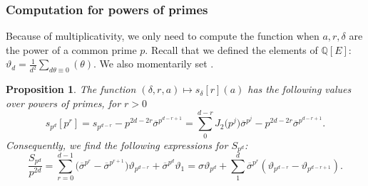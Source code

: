 \documentclass[pdftex]{sigma}
\newcommand{\QQ}{\mathbb{Q}}
\numberwithin{equation}{section}
\newtheorem{prop}[theo]{Proposition}
\theoremstyle{definition}
\begin{document}
\subsubsection{Computation for powers of primes} Because of multiplicativity, we only need to compute the function when $a,r,\delta$ are the power of a common prime $p$. Recall that we defined the elements of $\QQ[E]$: $\vartheta_d=\frac{1}{d^2}\sum_{d\theta\equiv 0}(\theta)$. We also momentarily set .


\begin{prop}\label{prop-expression-powers-primes}
 The function $(\delta,r,a)\mapsto s_\delta[r](a)$ has the following values over powers of primes, for $r>0$
 \[ s_{p^d}[p^r]=s_{p^{d-r}}-p^{2d-2r}\overline{\sigma}^{p^{d-r+1}} = \sum_0^{d-r} J_2\bigl(p^j\bigr)\overline{\sigma}^{p^j} -p^{2d-2r}\overline{\sigma}^{p^{d-r+1}} . \]
 Consequently, we find the following expressions for $S_{p^d}$:
 \[ \frac{S_{p^d}}{p^{2d}} = \sum_{r=0}^{d-1} \bigl(\overline{\sigma}^{p^r}-\overline{\sigma}^{p^{r+1}}\bigr)\vartheta_{p^{d-r}} + \overline{\sigma}^{p^d}\vartheta_1
 = \sigma\vartheta_{p^d} + \sum_1^d \overline{\sigma}^{p^r} (\vartheta_{p^{d-r}}-\vartheta_{p^{d-r+1}}). \]

\end{prop}
\end{document}
